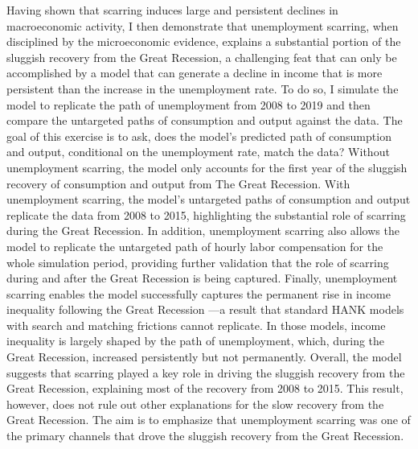 Having shown that scarring induces large and persistent declines in macroeconomic activity, I then demonstrate that unemployment scarring, when disciplined by the microeconomic evidence, explains a substantial portion of the sluggish recovery from the Great Recession, a challenging feat that can only be accomplished by a model that can generate a decline in income that is more persistent than the increase in the unemployment rate. To do so, I simulate the model to replicate the path of unemployment from 2008 to 2019 and then compare the untargeted paths of consumption and output against the data. The goal of this exercise is to ask, does the model's predicted path of consumption and output, conditional on the unemployment rate, match the data? Without unemployment scarring, the model only accounts for the first year of the sluggish recovery of consumption and output from The Great Recession. With unemployment scarring, the model's untargeted paths of consumption and output replicate the data from 2008 to 2015, highlighting the substantial role of scarring during the Great Recession. In addition, unemployment scarring also allows the model to replicate the untargeted path of hourly labor compensation for the whole simulation period, providing further validation that the role of scarring during and after the Great Recession is being captured. Finally, unemployment scarring enables the model successfully captures the permanent rise in income inequality following the Great Recession ---a result that standard HANK models with search and matching frictions cannot replicate. In those models, income inequality is largely shaped by the path of unemployment, which, during the Great Recession, increased persistently but not permanently. Overall, the model suggests that scarring played a key role in driving the sluggish recovery from the Great Recession, explaining most of the recovery from 2008 to 2015. This result, however, does not rule out other explanations for the slow recovery from the Great Recession. The aim is to emphasize that unemployment scarring was one of the primary channels that drove the sluggish recovery from the Great Recession.

